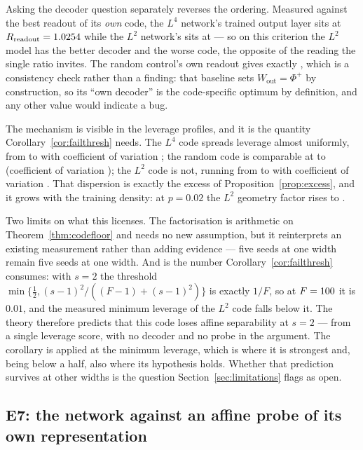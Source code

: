 \documentclass[preprint,12pt]{elsarticle}
\theoremstyle{definition}
\begin{document}
Asking the decoder question separately reverses the ordering. Measured against the best readout
of its \emph{own} code, the $L^4$ network's trained output layer sits at
$R_{\mathrm{readout}}=1.0254{}$ while the $L^2$ network's sits at
\GoneLtwoRreadoutWout{} --- so on this criterion the $L^2$ model has the better decoder and the
worse code, the opposite of the reading the single ratio invites. The random control's own
readout gives exactly \GoneRandRreadoutWout{}, which is a consistency check rather than a
finding: that baseline sets $W_{\mathrm{out}}=\Phi^{+}$ by construction, so its ``own decoder''
is the code-specific optimum by definition, and any other value would indicate a bug.

The mechanism is visible in the leverage profiles, and it is the quantity
Corollary~\ref{cor:failthresh} needs. The $L^4$ code spreads leverage almost uniformly, from
\GoneLfourLeverageMin{} to \GoneLfourLeverageMax{} with coefficient of variation
\GoneLfourLeverageCv{}; the random code is comparable at \GoneRandLeverageMin{} to
\GoneRandLeverageMax{} (coefficient of variation \GoneRandLeverageCv{}); the $L^2$ code is not,
running from \GoneLtwoLeverageMin{} to \GoneLtwoLeverageMax{} with coefficient of variation
\GoneLtwoLeverageCv{}. That dispersion is exactly the excess of Proposition~\ref{prop:excess},
and it grows with the training density: at $p=0.02$ the $L^2$ geometry factor rises to
\GoneLtwoRgeomDenseP{}.

Two limits on what this licenses. The factorisation is arithmetic on
Theorem~\ref{thm:codefloor} and needs no new assumption, but it reinterprets an existing
measurement rather than adding evidence --- five seeds at one width remain five seeds at one
width. And \GoneLtwoLeverageMin{} is the number Corollary~\ref{cor:failthresh} consumes: with
$s=2$ the threshold $\min\{\tfrac12,(s-1)^2/((F-1)+(s-1)^2)\}$ is exactly $1/F$, so at
$F=100$ it is $0.01$, and the measured minimum leverage of the $L^2$ code falls below it. The
theory therefore predicts that this code loses affine separability at $s=2$ --- from a single
leverage score, with no decoder and no probe in the argument. The corollary is applied at the
minimum leverage, which is where it is strongest and, being below a half, also where its
hypothesis holds. Whether that prediction survives at other widths is the
question Section~\ref{sec:limitations} flags as open.

\subsection{E7: the network against an affine probe of its own representation}
\label{sec:res-primary}
\end{document}
